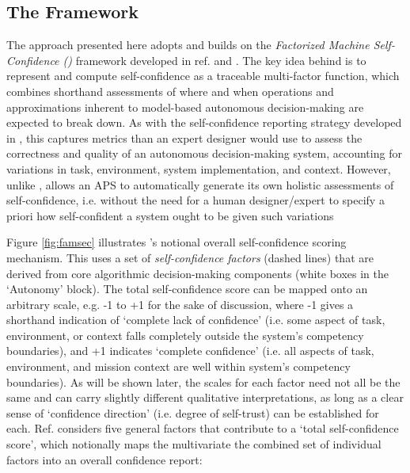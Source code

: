     \subsection{The \famsec{} Framework }
    The approach presented here adopts and builds on the \emph{Factorized Machine Self-Confidence (\famsec)} framework developed in ref.  and \cite{Aitken2016-cv,Aitken2016-fb}. The key idea behind \famsec{} is to represent and compute self-confidence as a traceable multi-factor function, which combines shorthand assessments of where and when operations and approximations inherent to model-based autonomous decision-making are expected to break down. As with the self-confidence reporting strategy developed in \cite{Hutchins2015-if}, this captures metrics than an expert designer would use to assess the correctness and quality of an autonomous decision-making system, accounting for variations in task, environment, system implementation, and context. However, unlike \cite{Hutchins2015-if}, \famsec{} allows an APS to automatically generate its own holistic assessments of self-confidence, i.e. without the need for a human designer/expert to specify a priori how self-confident a system ought to be given such variations %
    
    Figure \ref{fig:famsec} illustrates \famsec's notional overall self-confidence scoring mechanism. This uses a set of \emph{self-confidence factors} (dashed lines) that are derived from core algorithmic decision-making components (white boxes in the `Autonomy' block). The total self-confidence score can be mapped onto an arbitrary scale, e.g. -1 to +1 for the sake of discussion, where -1 gives a shorthand indication of `complete lack of confidence' (i.e. some aspect of task, environment, or context falls completely outside the system's competency boundaries), and +1 indicates `complete confidence' (i.e. all aspects of task, environment, and mission context are well within system's competency boundaries). As will be shown later, the scales for each factor need not all be the same and can carry slightly different qualitative interpretations, as long as a clear sense of `confidence direction' (i.e. degree of self-trust) can be established for each. 
    Ref. \cite{Aitken2016-cv} considers five general factors that contribute to a `total self-confidence score', which notionally maps the multivariate the combined set of individual factors into an overall confidence report:
    
